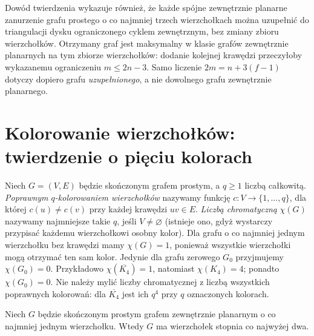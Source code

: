 \begin{uwaga}
Dowód twierdzenia wykazuje również, że każde spójne
zewnętrznie planarne zanurzenie grafu prostego o co
najmniej trzech wierzchołkach można uzupełnić do
triangulacji dysku ograniczonego cyklem zewnętrznym,
bez zmiany zbioru wierzchołków. Otrzymany graf jest
maksymalny w klasie grafów zewnętrznie planarnych
na tym zbiorze wierzchołków: dodanie kolejnej krawędzi
przeczyłoby wykazanemu ograniczeniu $m\le2n-3$. Samo liczenie
$2m=n+3(f-1)$ dotyczy dopiero grafu \emph{uzupełnionego},
a nie dowolnego grafu zewnętrznie planarnego.
\end{uwaga}

\section{Kolorowanie wierzchołków: twierdzenie o pięciu kolorach}
\label{sec:tg-five-color}

\begin{definicja}
Niech $G=(V,E)$ będzie skończonym grafem prostym,
a $q\ge1$ liczbą całkowitą.
\emph{Poprawnym $q$-kolorowaniem wierzchołków} nazywamy
funkcję $c:V\to\{1,\ldots,q\}$, dla której
$c(u)\ne c(v)$ przy każdej krawędzi $uv\in E$.
\emph{Liczbą chromatyczną} $\chi(G)$ nazywamy najmniejsze
takie $q$, jeśli $V\ne\varnothing$ (istnieje ono,
gdyż wystarczy przypisać każdemu wierzchołkowi osobny
kolor). Dla grafu o co najmniej jednym wierzchołku
bez krawędzi mamy $\chi(G)=1$, ponieważ wszystkie
wierzchołki mogą otrzymać ten sam kolor.
Jedynie dla grafu zerowego $G_0$ przyjmujemy $\chi(G_0)=0$.
Przykładowo $\chi(\overline{K_4})=1$, natomiast
$\chi(K_4)=4$; ponadto $\chi(G_0)=0$.
Nie należy mylić liczby chromatycznej z liczbą wszystkich
poprawnych kolorowań: dla $\overline{K_4}$ jest ich $q^4$
przy $q$ oznaczonych kolorach.
\end{definicja}

\begin{lemat}
\label{lem:tg-outerplanar-degree-two}
Niech $G$ będzie skończonym prostym grafem zewnętrznie
planarnym o co najmniej jednym wierzchołku. Wtedy
$G$ ma wierzchołek stopnia co najwyżej dwa.
\end{lemat}

